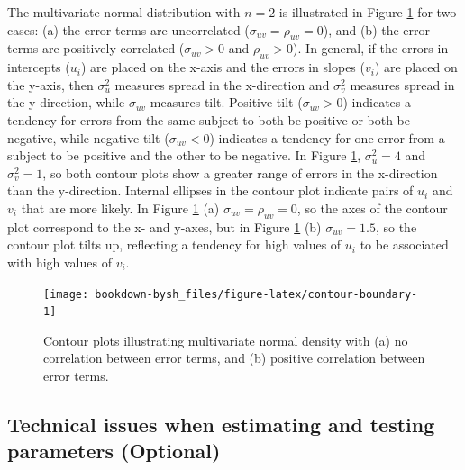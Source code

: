 \documentclass[
]{krantz}
\begin{document}
The multivariate normal distribution with \(n=2\) is illustrated in Figure \ref{fig:contour-boundary} for two cases: (a) the error terms are uncorrelated (\(\sigma_{uv}=\rho_{uv}=0\)), and (b) the error terms are positively correlated (\(\sigma_{uv}>0\) and \(\rho_{uv} > 0\)). In general, if the errors in intercepts (\(u_{i}\)) are placed on the x-axis and the errors in slopes (\(v_{i}\)) are placed on the y-axis, then \(\sigma_{u}^{2}\) measures spread in the x-direction and \(\sigma_{v}^{2}\) measures spread in the y-direction, while \(\sigma_{uv}\) measures tilt. Positive tilt (\(\sigma_{uv}>0\)) indicates a tendency for errors from the same subject to both be positive or both be negative, while negative tilt (\(\sigma_{uv}<0\)) indicates a tendency for one error from a subject to be positive and the other to be negative. In Figure \ref{fig:contour-boundary}, \(\sigma_{u}^{2}=4\) and \(\sigma_{v}^{2}=1\), so both contour plots show a greater range of errors in the x-direction than the y-direction. Internal ellipses in the contour plot indicate pairs of \(u_{i}\) and \(v_{i}\) that are more likely. In Figure \ref{fig:contour-boundary} (a) \(\sigma_{uv}=\rho_{uv}=0\), so the axes of the contour plot correspond to the x- and y-axes, but in Figure \ref{fig:contour-boundary} (b) \(\sigma_{uv}=1.5\), so the contour plot tilts up, reflecting a tendency for high values of \(u_{i}\) to be associated with high values of \(v_{i}\).

\begin{figure}

{\centering \texttt{[image: bookdown-bysh\_files/figure-latex/contour-boundary-1]} 

}

\caption{Contour plots illustrating multivariate normal density with (a) no correlation between error terms, and (b) positive correlation between error terms.}\label{fig:contour-boundary}
\end{figure}

\hypertarget{multileveltechnical}{%
\subsection{Technical issues when estimating and testing parameters (Optional)}\label{multileveltechnical}}
\end{document}
